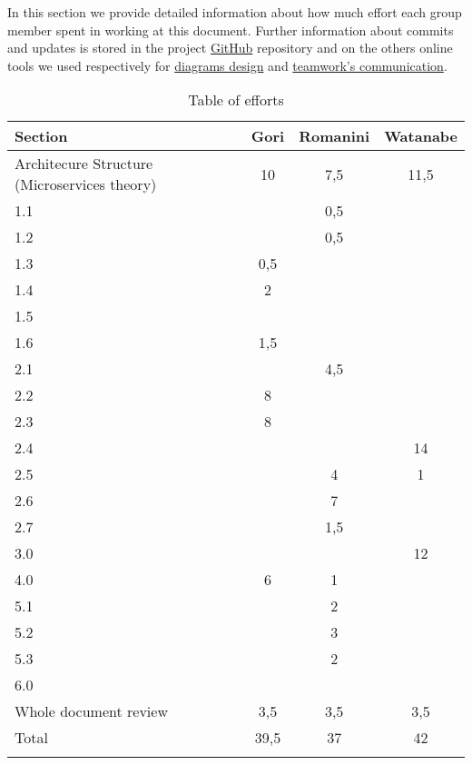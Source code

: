 In this section we provide detailed information about how much effort each group member spent in working at this document. Further information about commits and updates is stored in the project \href{https://github.com/MarcoRomanini/GoriRomaniniWatanabe}{GitHub} repository and on the others online tools we used respectively for \href{https://drive.google.com/file/d/1Vxg5pxG1UjMq_EQiZZ0EXS9QQszRacxV/view?usp=sharing}{diagrams design} and \href{https://docs.google.com/spreadsheets/d/1oVAjr1Xz0By4NLRS3uEOzcx4rHJzbUk16FAur9zYMFI/edit?usp=sharing}{teamwork's communication}.



\begin{center}
    \setlength\arrayrulewidth{1pt}
    \begin{longtable}{lccc}
        
        \hline
        \rowcolor{myblue}\color{white}Section & \color{white}Gori & \color{white}Romanini & \color{white}Watanabe \\
        \hline
        Architecure Structure (Microservices theory)	&	10	&	7,5	&	11,5	\\
        \hline
        1.1	&		&	0,5	&		\\
        \hline
        1.2	&		&	0,5	&		\\
        \hline
        1.3	&	0,5	&		&		\\
        \hline
        1.4	&	2	&		&		\\
        \hline
        1.5	&		&		&		\\
        \hline
        1.6	&	1,5	&		&		\\
        \hline
        2.1	&		&	4,5	&		\\
        \hline
        2.2	&	8	&		&		\\
        \hline
        2.3	&	8	&		&		\\
        \hline
        2.4	&		&		&	14	\\
        \hline
        2.5	&		&	4	&	1	\\
        \hline
        2.6	&		&	7	&		\\
        \hline
        2.7	&		&	1,5	&		\\
        \hline
        3.0	&		&		&	12	\\
        \hline
        4.0	&	6	&	1	&		\\
        \hline
        5.1	&		&	2	&		\\
        \hline
        5.2	&		&	3	&		\\
        \hline
        5.3	&		&	2	&		\\
        \hline
        6.0	&		&		&		\\
        \hline
        Whole document review 	&	3,5	&	3,5	&	3,5	\\
        \hline
        Total	&	39,5	&	37	&	42	\\
        \hline
        
        \rowcolor{white}\caption{\label{tab:effort}Table of efforts}
        
    \end{longtable}
\end{center}


